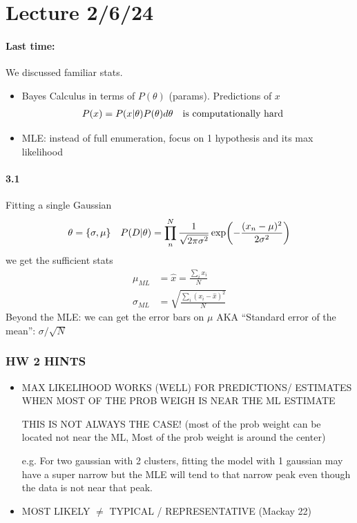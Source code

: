 \documentclass[../main.tex]{subfiles}
\begin{document}
\newpage
\section*{Lecture 2/6/24}
\barh \vspace{10px}

\paragraph{Last time:} We discussed familiar stats.
\begin{itemize}
    \item Bayes Calculus in terms of $P(\theta)$ (params). Predictions of $x$
    \begin{align*}
        P(x) = P(x| \theta) P(\theta) d\theta \qqtext{is computationally hard}
    \end{align*}
    \item MLE: instead of full enumeration, focus on 1 hypothesis and its max likelihood
\end{itemize}
\paragraph*{3.1} Fitting a single Gaussian
\begin{align*}
    \theta = \qt{\sigma, \mu} \quad P(D|\theta) = \prod_n^N \frac{1}{\sqrt{2\pi \sigma^2}}
    \exp(-\frac{(x_n - \mu)^2}{2\sigma^2})
\end{align*}
we get the sufficient stats
\begin{align*}
    \mu_{ML} &= \hat x = \frac{\sum_i x_i}{N} \\
    \sigma_{ML} &= \sqrt{\frac{\sum_i (x_i - \hat x)^2}{N}}
\end{align*}
Beyond the MLE: we can get the error bars on $\mu$ AKA ``Standard error of the mean'': $\sigma/\sqrt{N}$


\subsubsection*{HW 2 HINTS}
\begin{itemize}
    \item MAX LIKELIHOOD WORKS (WELL) FOR PREDICTIONS/ ESTIMATES WHEN MOST OF THE PROB WEIGH IS NEAR
    THE ML ESTIMATE

    THIS IS NOT ALWAYS THE CASE! (most of the prob weight can be located not near the ML, Most
    of the prob weight is around the center)

    e.g. For two gaussian with 2 clusters, fitting the model with 1 gaussian may have a super narrow
    but the MLE will tend to that narrow peak even though the data is not near that peak.

    \item MOST LIKELY $\neq$ TYPICAL / REPRESENTATIVE (Mackay 22)
\end{itemize}
\end{document}
